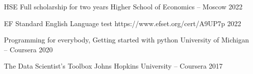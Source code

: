 



\begin{cvhonors}



  \cvhonor
    {HSE Full scholarship for two years} %
    {Higher School of Economics -- Moscow} %
    {} %
    {2022} %

  \cvhonor
    {EF Standard English Language test} %
    {https://www.efset.org/cert/A9UP7p} %
    {} %
    {2022} %

  \cvhonor
    {Programming for everybody, Getting started with python} %
    {University of Michigan -- Coursera} %
    {} %
    {2020} %

  \cvhonor
    {The Data Scientist’s Toolbox } %
    {Johns Hopkins University -- Coursera} %
    {} %
    {2017} %

   
    
\end{cvhonors}